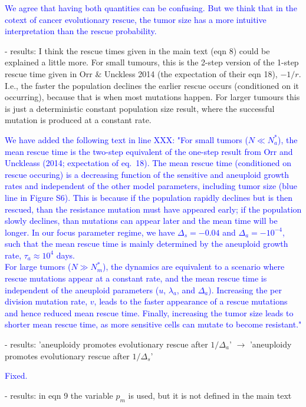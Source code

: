 \documentclass[12pt]{extarticle}
\begin{document}
\textcolor{blue}{
We agree that having both quantities can be confusing. But we think that in the cotext of cancer evolutionary rescue, the tumor size has a more intuitive interpretation than the rescue probability.
}

- results: I think the rescue times given in the main text (eqn 8) could be explained a little more. For small tumours, this is the 2-step version of the 1-step rescue time given in Orr $\&$ Unckless 2014 (the expectation of their eqn 18), $-1/r$. I.e., the faster the population declines the earlier rescue occurs (conditioned on it occurring), because that is when most mutations happen. For larger tumours this is just a deterministic constant population size result, where the successful mutation is produced at a constant rate.

\textcolor{blue}{%
We have added the following text in line XXX: "For small tumors ($ N \ll N_a^*$), the mean rescue time is the two-step equivalent of the one-step result from Orr and Unckleass (2014; expectation of eq.~18). The mean rescue time (conditioned on rescue occuring) is a decreasing function of the sensitive and aneuploid growth rates and independent of the other model parameters, including tumor size (blue line in Figure S6). This is because if the population rapidly declines but is then rescued, than the resistance mutation must have appeared early; if the population slowly declines, than mutations can appear later and the mean time will be longer. In our focus parameter regime, we have $\Delta_s=-0.04$ and $\Delta_a=-10^{-4}$, such that the mean rescue time is mainly determined by the aneuploid growth rate, $\tau_a \approx 10^4$ days. 
\\
For large tumors ($N \gg N_m^*$), the dynamics are equivalent to a scenario where rescue mutations appear at a constant rate, and the mean rescue time is independent of the aneuploid parameters ($u$, $\lambda_a$, and $\Delta_a$). Increasing the per division mutation rate, $v$, leads to the faster appearance of a rescue mutations and hence reduced mean rescue time. Finally, increasing the tumor size leads to shorter mean rescue time, as more sensitive cells can mutate to become resistant."
}

- results: 'aneuploidy promotes evolutionary rescue after $1/\Delta_a$' $\rightarrow$ 'aneuploidy promotes evolutionary rescue after $1/\Delta_s$'

\textcolor{blue}{Fixed.} %

- results: in eqn 9 the variable $p_m$ is used, but it is not defined in the main text
\end{document}
